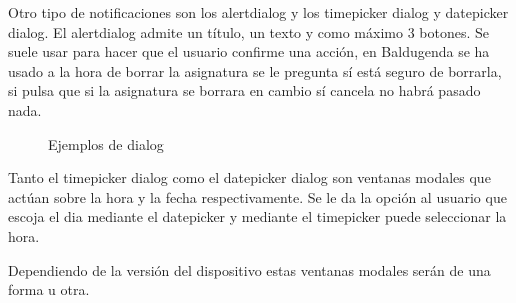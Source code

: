 Otro tipo de notificaciones son los alertdialog y los timepicker dialog y datepicker dialog.
El alertdialog admite un título, un texto y como máximo 3 botones. Se suele usar para hacer que el usuario confirme una acción, en Baldugenda se ha usado a la hora de borrar la asignatura se le pregunta sí está seguro de borrarla, si pulsa que si la asignatura se borrara en cambio sí cancela no habrá pasado nada.
\newpage
\begin{figure}[H] 
  \begin{center} 
    \caption{Ejemplos de dialog} 
    \label{fig:EjemplosDialog} 
  \end{center} 
\end{figure}

Tanto el timepicker dialog como el datepicker dialog son ventanas modales que actúan sobre la hora y la fecha respectivamente.
Se le da la opción al usuario que escoja el dia mediante el datepicker y mediante el timepicker puede seleccionar la hora.

Dependiendo de la versión del dispositivo estas  ventanas modales serán de una forma u otra.

